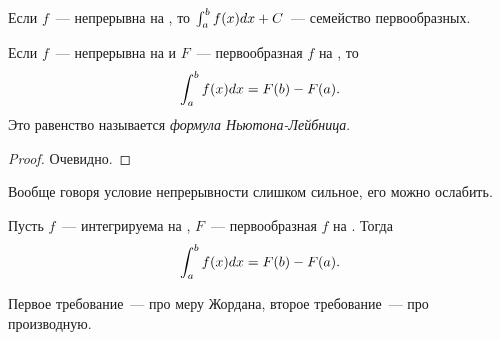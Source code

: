 \documentclass[../main.tex]{subfiles}
\begin{document}
\begin{corollary}
    Если $f$~--- непрерывна на \segab, то $\int_a^b f(x) dx + C$~--- семейство первообразных.
\end{corollary}

\begin{corollary}
    Если $f$~--- непрерывна на \segab\space и $F$~--- первообразная $f$ на \segab, то 
    \begin{gather*}
        \int_a^b f(x) dx = F(b) - F(a).
    \end{gather*}
    Это равенство называется \emph{формула Ньютона-Лейбница}. 
\end{corollary}

\begin{proof}
    Очевидно.
\end{proof}

\begin{note}
    Вообще говоря условие непрерывности слишком сильное, его можно ослабить.
\end{note}

\begin{proposition}
    Пусть $f$~--- интегрируема на \segab, $F$~--- первообразная $f$ на \segab. Тогда 
    \begin{gather*}
        \int_a^b f(x) dx = F(b) - F(a).
    \end{gather*}
\end{proposition}

\begin{note}
    Первое требование~--- про меру Жордана, второе требование~--- про производную.
\end{note}
\end{document}
